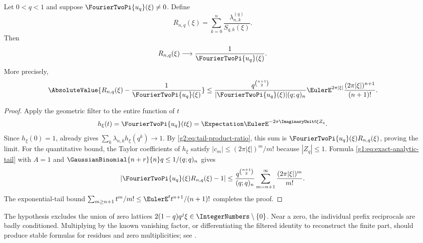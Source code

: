 \begin{theorem}
\label{g2:thm:reciprocal-product}
Let $0<q<1$ and suppose $\FourierTwoPi{u_q}(\xi)\ne0$.  Define
\begin{equation}
 R_{n,q}(\xi)=\sum_{k=0}^n
 \frac{\lambda_{n,k}^{(q)}}{S_{q,k}(\xi)}.
 \label{g2:eq:reciprocal-approximant}
\end{equation}
Then
\begin{equation}
 R_{n,q}(\xi)\longrightarrow\frac1{\FourierTwoPi{u_q}(\xi)}.
 \label{g2:eq:reciprocal-limit}
\end{equation}
More precisely,
\begin{equation}
 \AbsoluteValue{R_{n,q}(\xi)-\frac1{\FourierTwoPi{u_q}(\xi)}}
 \le
 \frac{q^{\binom{n+1}{2}}}{|\FourierTwoPi{u_q}(\xi)|(q;q)_n}
 \EulerE^{2\pi|\xi|}\frac{(2\pi|\xi|)^{n+1}}{(n+1)!}.
 \label{g2:eq:reciprocal-error-bound}
\end{equation}
\end{theorem}

\begin{proof}
Apply the geometric filter to the entire function of $t$
\[
 h_\xi(t)=\FourierTwoPi{u_q}(t\xi)=\Expectation\EulerE^{-2\pi\ImaginaryUnit t\xi Z_q}.
\]
Since $h_\xi(0)=1$,  already gives
$\sum_k\lambda_{n,k}h_\xi(q^k)\to1$.  By
\eqref{g2:eq:tail-product-ratio}, this sum is
$\FourierTwoPi{u_q}(\xi)R_{n,q}(\xi)$, proving the limit.
For the quantitative bound, the Taylor coefficients of $h_\xi$ satisfy
$|c_m|\le(2\pi|\xi|)^m/m!$ because $|Z_q|\le1$.  Formula
\eqref{g1:eq:exact-analytic-tail} with $A=1$ and
$\GaussianBinomial{n+r}{n}q\le1/(q;q)_n$ gives
\[
 |\FourierTwoPi{u_q}(\xi)R_{n,q}(\xi)-1|
 \le\frac{q^{\binom{n+1}{2}}}{(q;q)_n}
 \sum_{m=n+1}^\infty\frac{(2\pi|\xi|)^m}{m!}.
\]
The exponential-tail bound
$\sum_{m\ge n+1}t^m/m!\le\EulerE^t t^{n+1}/(n+1)!$ completes the proof.
\end{proof}

\begin{remark}
The hypothesis excludes the union of zero lattices
$2(1-q)q^j\xi\in\IntegerNumbers\setminus\{0\}$.  Near a zero, the individual prefix
reciprocals are badly conditioned.  Multiplying by the known vanishing factor,
or differentiating the filtered identity to reconstruct the finite part,
should produce stable formulas for residues and zero multiplicities; see
.
\end{remark}


